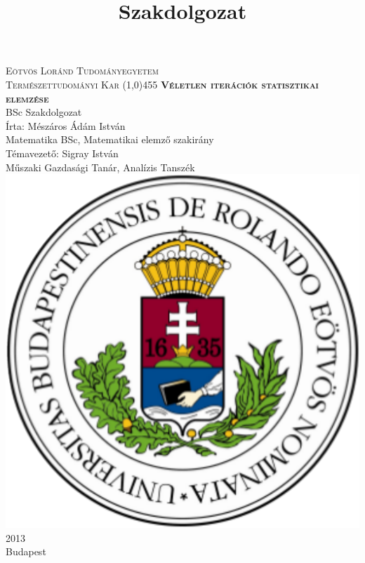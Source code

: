 \documentclass[a4paper,12pt]{report}
\title{Szakdolgozat}
\newcommand{\noun}[1]{\textsc{#1}}
\begin{document}
\begin{singlespace} 


	\thispagestyle{empty}
	\begin{center}
		{\large \noun{Eötvös Loránd Tudományegyetem \\ Természettudományi Kar} }
		\line(1,0){455}
		\vspace{80pt}
		{\Huge \noun{\textbf{Véletlen iterációk statisztikai elemzése}}}
		\vspace{20pt}
		\\BSc Szakdolgozat
		\vspace{90pt}
		\\Írta: Mészáros Ádám István\\ Matematika BSc, Matematikai elemző szakirány\\
		\vspace{35pt}
		Témavezető: Sigray István\\ Műszaki Gazdasági Tanár, Analízis Tanszék\\
		\vspace{100pt}
		\includegraphics[scale=0.21]{elte.png}
		\vspace{25pt}
		\\ 2013\\ Budapest
	\end{center}
\end{singlespace}
	\tableofcontents
\end{document}
